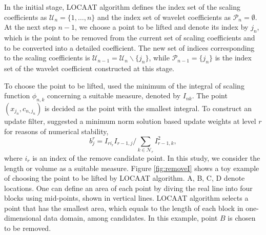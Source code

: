 \documentclass[11pt,titlepage]{article}
\begin{document}
In the initial stage, LOCAAT algorithm defines the index set of the scaling coefficients as $\mathcal{U}_{n} = \{1,\ldots,n\}$ and the index set of wavelet coefficients as $\mathcal{P}_{n} = \emptyset$. At the next step $n-1$, we choose a point to be lifted and denote its index by $j_{n}$, which is the point to be removed from the current set of scaling coefficients and to be converted into a detailed coefficient. The new set of indices corresponding to the scaling coefficients is $\mathcal{U}_{n-1} = \mathcal{U}_{n} \backslash \{j_{n}\}$, while $\mathcal{P}_{n-1} = \{ j_{n}\}$ is the index set of the wavelet coefficient constructed at this stage.

To choose the point to be lifted, \cite{Jansen2009} used the minimum of the integral of scaling function $\phi_{n,k}$ concerning  a suitable measure, denoted by $I_{nk}$. The point $(x_{j_n} , c_{n,j_n})$ is decided as the point with the smallest integral. To construct an update filter, \citet{Jansen2009} suggested a minimum norm solution based update weights at level $r$ for reasons of numerical stability,
\begin{equation}
\label{eqn:updatefilter}
b_{j}^r = I_{r i_r}I_{r-1,j}/ \sum_{k\in \mathcal{N}_r} I_{r-1,k}^2,
\end{equation}
where $i_r$ is an index of the remove candidate point. In this study, we consider the length or volume as a suitable measure. Figure \ref{fig:removeI} shows a toy example of choosing the point to be lifted by LOCAAT algorithm. A, B, C, D denote locations. One can define an area of each point by diving the real line into four blocks using mid-points, shown in vertical lines. LOCAAT algorithm selects a point that has the smallest area, which equals to the length of each block in one-dimensional data domain, among candidates. 
In this example, point $B$ is chosen to be removed. 
\end{document}

